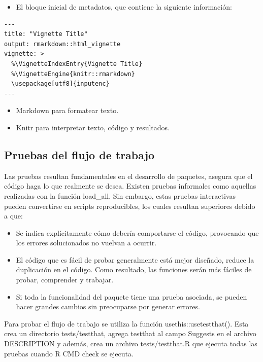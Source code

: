 \begin{itemize}
\item El bloque inicial de metadatos, que contiene la siguiente información:
\end{itemize}

\begin{verbatim}
---
title: "Vignette Title"
output: rmarkdown::html_vignette
vignette: >
  %\VignetteIndexEntry{Vignette Title}
  %\VignetteEngine{knitr::rmarkdown}
  \usepackage[utf8]{inputenc}
---
\end{verbatim}

\begin{itemize}
\item Markdown para formatear texto.
\item Knitr para interpretar texto, código y resultados.
\end{itemize}

\subsection{Pruebas del flujo de trabajo}

Las pruebas resultan fundamentales en el desarrollo de paquetes, asegura que el código haga lo que realmente se desea. Existen pruebas informales como aquellas realizadas con la función load\_all. Sin embargo, estas pruebas interactivas pueden convertirse en scripts reproducibles, los cuales resultan superiores debido a que:

\begin{itemize}
\item Se indica explícitamente cómo debería comportarse el código, provocando que los errores solucionados no vuelvan a ocurrir.

\item El código que es fácil de probar generalmente está mejor diseñado, reduce la duplicación en el código. Como resultado, las funciones serán más fáciles de probar, comprender y trabajar.

\item Si toda la funcionalidad del paquete tiene una prueba asociada, se pueden hacer grandes cambios sin preocuparse por generar errores.
\end{itemize}


Para probar el flujo de trabajo se utiliza la función usethis::usetestthat(). Esta crea un directorio tests/testthat, agrega testthat al campo Suggests en el archivo DESCRIPTION y además, crea un archivo tests/testthat.R que ejecuta todas las pruebas cuando R CMD check se ejecuta. 

